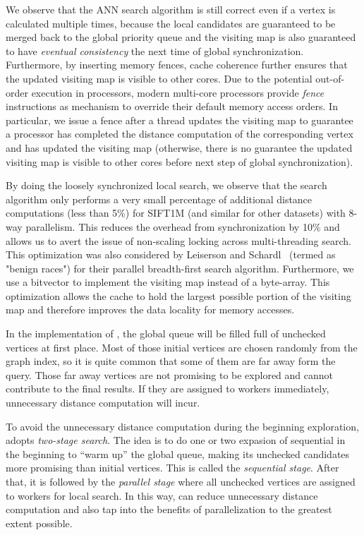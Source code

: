 We observe that the ANN search algorithm is still correct even if a vertex is calculated multiple times, because the local candidates are guaranteed to be merged back to the global priority queue and the visiting map is also guaranteed to have \emph{eventual consistency} the next time of global synchronization. Furthermore, by inserting memory fences, cache coherence further ensures that the updated visiting map is visible to other cores. Due to the potential out-of-order execution in processors, modern multi-core processors provide \emph{fence} instructions as mechanism to override their default memory access orders. In particular, we issue a fence after a thread updates the visiting map to guarantee a processor has completed the distance computation of the corresponding vertex and has updated the visiting map (otherwise, there is no guarantee the updated visiting map is visible to other cores before next step of global synchronization).

By doing the loosely synchronized local search, we observe that the search algorithm only performs a very small percentage of additional distance computations (less than 5\%) for {SIFT1M} (and similar for other datasets) with 8-way parallelism. This reduces  the overhead from synchronization by 10\% and allows us to avert the issue of non-scaling locking across multi-threading search. This optimization was also considered by Leiserson and Schardl~\cite{benign-race} (termed as "benign races") for their parallel breadth-first search algorithm. 
Furthermore, we use a bitvector to implement the visiting map instead of a byte-array.
This optimization allows the cache to hold the largest possible portion of the visiting map and therefore improves the data locality for memory accesses. 

In the implementation of \Hammer, the global queue will be filled full of unchecked vertices at first place. Most of those initial vertices are chosen randomly from the graph index, so it is quite common that some of them are far away form the query. Those far away vertices are not promising to be explored and cannot contribute to the final results. If they are assigned to workers immediately, unnecessary distance computation will incur.

To avoid the unnecessary distance computation during the beginning exploration, \Hammer adopts \emph{two-stage search}. The idea is to do one or two expasion of sequential \SeqShortName in the beginning to ``warm up'' the global queue, making its unchecked candidates more promising than initial vertices. This is called the \emph{sequential stage}.
After that, it is followed by the \emph{parallel stage} where all unchecked vertices are assigned to workers for local search. In this way, \Hammer can reduce unnecessary distance computation and also tap into the benefits of parallelization to the greatest extent possible.


